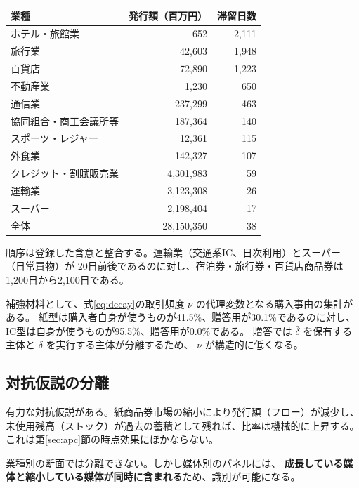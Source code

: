 \begin{center}
\begin{tabular}{@{}lrr@{}}
\toprule
業種 & 発行額（百万円） & 滞留日数 \\
\midrule
ホテル・旅館業 & 652 & 2,111 \\
旅行業 & 42,603 & 1,948 \\
百貨店 & 72,890 & 1,223 \\
不動産業 & 1,230 & 650 \\
通信業 & 237,299 & 463 \\
協同組合・商工会議所等 & 187,364 & 140 \\
スポーツ・レジャー & 12,361 & 115 \\
外食業 & 142,327 & 107 \\
クレジット・割賦販売業 & 4,301,983 & 59 \\
運輸業 & 3,123,308 & 26 \\
スーパー & 2,198,404 & 17 \\
\midrule
全体 & 28,150,350 & 38 \\
\bottomrule
\end{tabular}
\label{tab:family2-industry-durations}
\end{center}

順序は登録した含意と整合する。運輸業（交通系IC、日次利用）とスーパー（日常買物）が
20日前後であるのに対し、宿泊券・旅行券・百貨店商品券は1,200日から2,100日である。

補強材料として、式\eqref{eq:decay}の取引頻度 $\nu$ の代理変数となる購入事由の集計がある。
紙型は購入者自身が使うものが41.5\%、贈答用が30.1\%であるのに対し、
IC型は自身が使うものが95.5\%、贈答用が0.0\%である。
贈答では $\bar\delta$ を保有する主体と $\delta$ を実行する主体が分離するため、
$\nu$ が構造的に低くなる。

\subsection{対抗仮説の分離}

有力な対抗仮説がある。紙商品券市場の縮小により発行額（フロー）が減少し、
未使用残高（ストック）が過去の蓄積として残れば、比率は機械的に上昇する。
これは第\ref{sec:apc}節の時点効果にほかならない。

業種別の断面では分離できない。しかし媒体別のパネルには、
\textbf{成長している媒体と縮小している媒体が同時に含まれる}ため、識別が可能になる。

